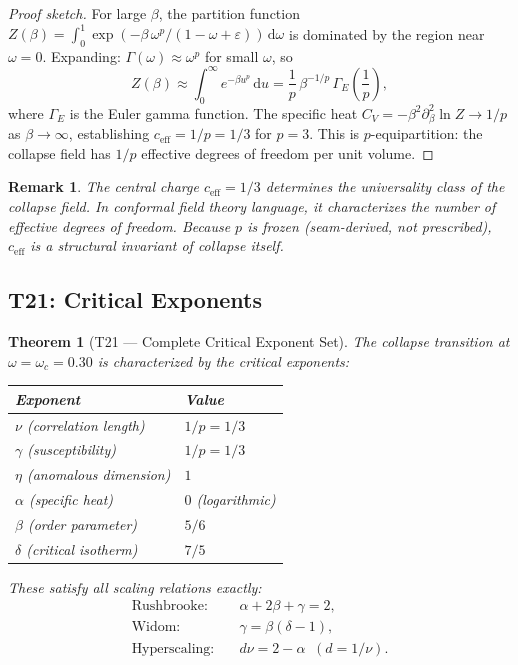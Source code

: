 \documentclass[
  aps,
  prd,
  preprint,
  superscriptaddress,
  nofootinbib,
  floatfix,
  longbibliography
]{revtex4-2}
\newtheorem{theorem}{Theorem}
\newtheorem{remark}{Remark}
\newcommand{\Gam}{\Gamma}
\newcommand{\eps}{\varepsilon}
\newcommand{\dd}{\mathrm{d}}
\newcommand{\beq}{\begin{equation}}
\newcommand{\eeq}{\end{equation}}
\newcommand{\Drft}{\omega}
\newcommand{\ceff}{c_{\mathrm{eff}}}
\begin{document}
\begin{proof}[Proof sketch]
For large $\beta$, the partition function
$Z(\beta) = \int_0^1 \exp(-\beta\,\Drft^p/(1-\Drft+\eps))\,\dd\Drft$
is dominated by the region near $\Drft = 0$.
Expanding: $\Gam(\Drft) \approx \Drft^p$ for small $\Drft$, so
\beq
  Z(\beta) \approx \int_0^\infty
    e^{-\beta u^p}\,\dd u
  = \frac{1}{p}\,\beta^{-1/p}\,
    \Gamma_{\!E}\!\left(\frac{1}{p}\right),
\eeq
where $\Gamma_{\!E}$ is the Euler gamma function.
The specific heat
$C_V = -\beta^2 \partial^2_\beta \ln Z \to 1/p$
as $\beta \to \infty$,
establishing $\ceff = 1/p = 1/3$ for $p = 3$.
This is $p$-equipartition: the collapse field has
$1/p$ effective degrees of freedom per unit volume.
\end{proof}

\begin{remark}
The central charge $\ceff = 1/3$ determines the universality class
of the collapse field. In conformal field theory language,
it characterizes the number of effective degrees of freedom.
Because $p$ is frozen (seam-derived, not prescribed),
$\ceff$ is a structural invariant of collapse itself.
\end{remark}

\subsection{T21: Critical Exponents}

\begin{theorem}[T21 — Complete Critical Exponent Set]\label{thm:T21}
The collapse transition at $\Drft = \Drft_c = 0.30$ is
characterized by the critical exponents:
\begin{center}
\begin{tabular}{@{}ll@{}}
\toprule
Exponent & Value \\
\midrule
$\nu$ (correlation length) & $1/p = 1/3$ \\
$\gamma$ (susceptibility) & $1/p = 1/3$ \\
$\eta$ (anomalous dimension) & $1$ \\
$\alpha$ (specific heat) & $0$ (logarithmic) \\
$\beta$ (order parameter) & $5/6$ \\
$\delta$ (critical isotherm) & $7/5$ \\
\bottomrule
\end{tabular}
\end{center}
These satisfy all scaling relations exactly:
\begin{align}
  \text{Rushbrooke:}&\quad \alpha + 2\beta + \gamma = 2, \nonumber\\
  \text{Widom:}&\quad \gamma = \beta(\delta - 1), \nonumber\\
  \text{Hyperscaling:}&\quad d\nu = 2 - \alpha
    \;\;(d = 1/\nu). \nonumber
\end{align}
\end{theorem}
\end{document}
